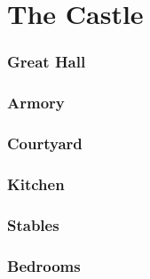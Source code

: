 \chapter{The Castle}

\thispagestyle{empty}



\pagebreak

\subsection{Great Hall}



\pagebreak


\subsection{Armory}



\pagebreak


\subsection{Courtyard}



\pagebreak


\subsection{Kitchen}



\pagebreak


\subsection{Stables}



\pagebreak


\subsection{Bedrooms}



\pagebreak
	